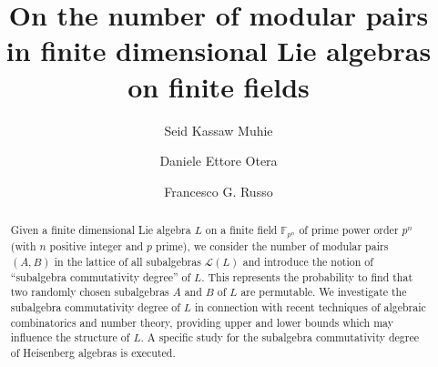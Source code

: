 \documentclass{amsart}
\theoremstyle{definition}
\numberwithin{equation}{section}
\begin{document}
\title[On the number of modular pairs...]{On the number of modular pairs\\ 
in finite dimensional Lie algebras on finite fields}


\author[S.K. Muhie]{Seid Kassaw Muhie}
\address{Seid Kassaw Muhie \endgraf  
Institute of Data Science and Digital Technologies\endgraf 
Vilnius University -- Lithuania\endgraf
}


\author[D.E. Otera]{Daniele Ettore Otera}
\address{Daniele Ettore Otera \endgraf  
Institute of Data Science and Digital Technologies \endgraf  Vilnius University -- Lithuania \endgraf
}

\author[F.G. Russo]{Francesco G. Russo}
\address{Francesco G. Russo \endgraf
School of Science and Technology \endgraf 
University of Camerino -- Italy \endgraf
and \endgraf
Department of Mathematics and Applied Mathematics \endgraf University of the Western Cape -- South Africa\endgraf
and
\endgraf
Department of Mathematics and Applied Mathematics \endgraf University of Cape Town -- South Africa
}






\begin{abstract} 
Given a finite dimensional Lie algebra $L$ on a finite field $\mathbb{F}_{p^n}$ of prime power order $p^n$ (with $n$ positive integer and $p$ prime), we consider the number of modular pairs $(A,B)$ in the lattice of all subalgebras $\mathcal{L}(L)$ and introduce the notion of ``subalgebra  commutativity degree'' of $L$. This represents the probability to find that two randomly chosen  subalgebras $A$ and $B$ of $L$ are permutable. We investigate the subalgebra commutativity degree of $L$ in connection with recent techniques of algebraic combinatorics and number theory, providing upper and lower bounds which may influence the structure of $L$.  A specific study for the subalgebra commutativity degree of Heisenberg  algebras  is executed.
\end{abstract}
\end{document}
